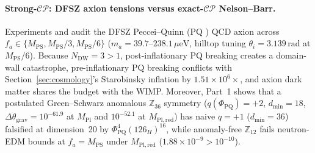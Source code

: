 \paragraph{Strong-$\mathcal{CP}$: DFSZ axion tensions versus exact-$\mathcal{CP}$ Nelson--Barr.}
Experiments  and  audit the DFSZ Peccei--Quinn (PQ \cite{peccei1977}) QCD axion
across $f_a \in \{M_{\mathrm{PS}}, M_{\mathrm{PS}}/3, M_{\mathrm{PS}}/6\}$ ($m_a = 39.7\text{--}238.1\,\mu\mathrm{eV}$,
hilltop tuning $\theta_i = 3.139\,\mathrm{rad}$ at $M_{\mathrm{PS}}/6$). Because $N_{\mathrm{DW}} = 3 > 1$,
post-inflationary PQ breaking creates a domain-wall catastrophe, pre-inflationary PQ breaking conflicts with
Section~\ref{sec:cosmology}'s Starobinsky inflation by $1.51 \times 10^6\times$, and axion dark matter shares the
budget with the WIMP. Moreover,  Part~1 shows that a postulated Green--Schwarz anomalous
$\mathbb{Z}_{36}$ symmetry ($q(\Phi_{\mathrm{PQ}}) = +2$, $d_{\min} = 18$, $\Delta\theta_{\mathrm{grav}} = 10^{-61.9}$
at $M_{\mathrm{Pl}}$ and $10^{-52.1}$ at $M_{\mathrm{Pl,red}}$) has naive $q = +1$ ($d_{\min} = 36$) falsified at
dimension~20 by $\Phi_{\mathrm{PQ}}^4 (126_H)^{16}$, while anomaly-free $\mathbb{Z}_{12}$ fails neutron-EDM bounds at
$f_a = M_{\mathrm{PS}}$ under $M_{\mathrm{Pl,red}}$ ($1.88 \times 10^{-9} > 10^{-10}$).

